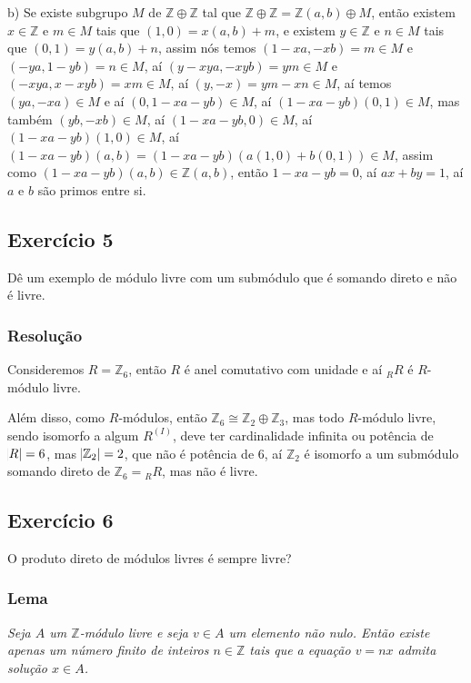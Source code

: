\documentclass[10pt,a4paper]{article}
\begin{document}
\medskip
\noindent
b) Se existe subgrupo $M$ de $\mathbb{Z}\oplus\mathbb{Z}$ tal que $\mathbb{Z}\oplus\mathbb{Z}=\mathbb{Z}(a,b)\oplus M$, então existem $x\in\mathbb{Z}$ e $m\in M$ tais que $(1,0)=x(a,b)+m$, e existem $y\in\mathbb{Z}$ e $n\in M$ tais que $(0,1)=y(a,b)+n$, assim nós temos $(1-xa,-xb)=m\in M$ e $(-ya,1-yb)=n\in M$, aí $(y-xya,-xyb)=ym\in M$ e $(-xya,x-xyb)=xm\in M$, aí $(y,-x)=ym-xn\in M$, aí temos $(ya,-xa)\in M$ e aí $(0,1-xa-yb)\in M$, aí $(1-xa-yb)(0,1)\in M$, mas também $(yb,-xb)\in M$, aí $(1-xa-yb,0)\in M$, aí $(1-xa-yb)(1,0)\in M$, aí $(1-xa-yb)(a,b)=(1-xa-yb)(a(1,0)+b(0,1))\in M$, assim como $(1-xa-yb)(a,b)\in\mathbb{Z}(a,b)$, então $1-xa-yb=0$, aí $ax+by=1$, aí $a$ e $b$ são primos entre si.

\subsection*{Exercício 5}

Dê um exemplo de módulo livre com um submódulo que é somando direto e não é livre.

\subsubsection*{Resolução}

Consideremos $R=\mathbb{Z}_6$, então $R$ é anel comutativo com unidade e aí $_RR$ é $R$-módulo livre.

\medskip
\noindent
Além disso, como $R$-módulos, então $\mathbb{Z}_6\cong\mathbb{Z}_2\oplus\mathbb{Z}_3$, mas todo $R$-módulo livre, sendo isomorfo a algum $R^{(I)}$, deve ter cardinalidade infinita ou potência de $\abs{R}=6$, mas $\abs{\mathbb{Z}_2}=2$, que não é potência de $6$, aí $\mathbb{Z}_2$ é isomorfo a um submódulo somando direto de $\mathbb{Z}_6={}_RR$, mas não é livre.

\subsection*{Exercício 6}

O produto direto de módulos livres é sempre livre?

\subsubsection*{Lema}

\textit{Seja $A$ um $\mathbb{Z}$-módulo livre e seja $v\in A$ um elemento não nulo. Então existe apenas um número finito de inteiros $n\in\mathbb{Z}$ tais que a equação $v=nx$ admita solução $x\in A$.}
\end{document}
